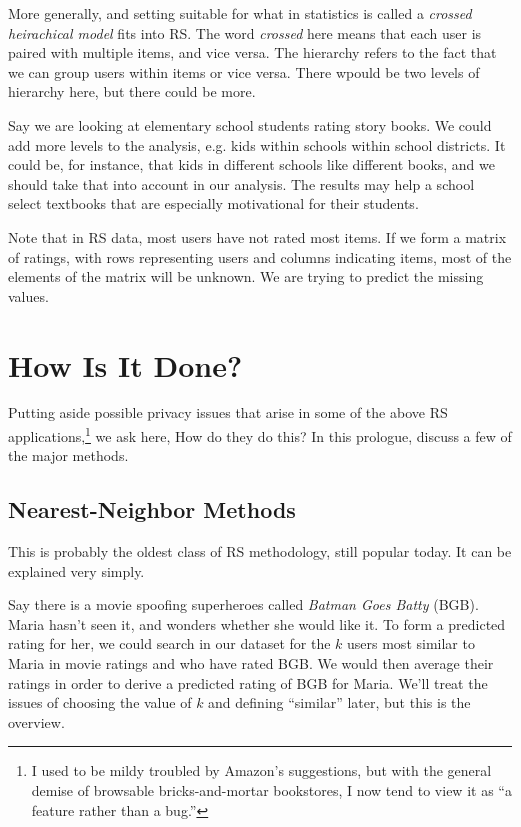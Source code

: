 More generally, and setting suitable for what in statistics is called
a \textit{crossed heirachical model} fits into RS.  The word
\textit{crossed} here means that each user is paired with multiple
items, and vice versa.  The hierarchy refers to the fact that we can
group users within items or vice versa.  There wpould be two levels of
hierarchy here, but there could be more.  

Say we are looking at elementary school students rating story books.  We
could add more levels to the analysis, e.g. kids within schools within
school districts.  It could be, for instance, that kids in different
schools like different books, and we should take that into account in
our analysis.  The results may help a school select textbooks that are
especially motivational for their students.

Note that in RS data, most users have not rated most items.  If we form
a matrix of ratings, with rows representing users and columns indicating
items, most of the elements of the matrix will be unknown.  We are
trying to predict the missing values.

\section{How Is It Done?}

Putting aside possible privacy issues that arise in some of the above RS
applications,\footnote{I used to be mildy
troubled by Amazon's suggestions, but with the general demise of
browsable bricks-and-mortar bookstores, I now tend to view it as ``a
feature rather than a bug.''} we ask here, How do they do this?  In this
prologue, discuss a few of the major methods.

\subsection{Nearest-Neighbor Methods}

This is probably the oldest class of RS methodology, still popular
today.  It can be explained very simply.

Say there is a movie spoofing superheroes called \textit{Batman Goes
Batty} (BGB).  Maria hasn't seen it, and wonders whether she would like
it.  To form a predicted rating for her, we could search in our dataset
for the $k$ users most similar to Maria in movie ratings and who have
rated BGB.  We would then average their ratings in order to derive a
predicted rating of BGB for Maria.  We'll treat the issues of choosing
the value of $k$ and defining ``similar'' later, but this is the
overview.

